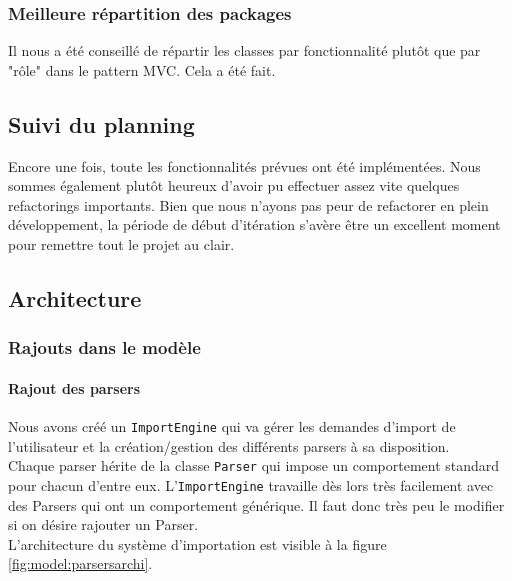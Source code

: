 	\subsubsection{Meilleure répartition des packages}
	Il nous a été conseillé de répartir les classes par fonctionnalité plutôt
	que par "rôle" dans le pattern MVC. Cela a été fait.


\subsection{Suivi du planning}
Encore une fois, toute les fonctionnalités prévues ont été implémentées. Nous 
sommes également plutôt heureux d'avoir pu effectuer assez vite quelques 
refactorings importants. Bien que nous n'ayons pas peur de refactorer en plein 
développement, la période de début d'itération s'avère être un excellent moment 
pour remettre tout le projet au clair.


\subsection{Architecture}
	
	\subsubsection{Rajouts dans le modèle}

		\paragraph{Rajout des parsers}
		Nous avons créé un \texttt{ImportEngine} qui va gérer les demandes 
		d'import de l'utilisateur et la création/gestion des différents parsers 
		à sa disposition. \\

		Chaque parser hérite de la classe \texttt{Parser} qui impose un comportement
		standard pour chacun d'entre eux. L'\texttt{ImportEngine} travaille dès
		lors très facilement avec des Parsers qui ont un comportement générique.
		Il faut donc très peu le modifier si on désire rajouter un Parser.\\

		L'architecture du système d'importation est visible à la figure \ref{fig:model:parsersarchi}.

